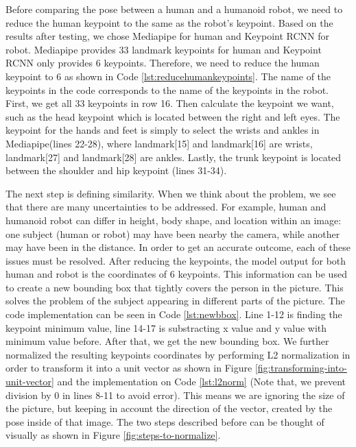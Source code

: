 Before comparing the pose between a human and a humanoid robot, we need to reduce the human keypoint to the same as the robot's keypoint.
Based on the results after testing, we chose Mediapipe for human and Keypoint RCNN for robot. Mediapipe provides 33 landmark keypoints for human and Keypoint RCNN only provides 6 keypoints.
Therefore, we need to reduce the human keypoint to 6 as shown in Code \ref{lst:reducehumankeypoints}.
The name of the keypoints in the code corresponds to the name of the keypoints in the robot. First, we get all 33 keypoints in row 16. Then calculate the keypoint we want, such as the head keypoint which is located between the right and left eyes.
The keypoint for the hands and feet is simply to select the wrists and ankles in Mediapipe(lines 22-28), where landmark[15] and landmark[16] are wrists, landmark[27] and landmark[28] are ankles. Lastly, the trunk keypoint is located between the shoulder and hip keypoint (lines 31-34).



The next step is defining similarity. When we think about the problem, we see that there are many uncertainties to be addressed. For example, human and humanoid robot can differ in height, body shape, and location within an image: one subject (human or robot) may have been nearby the camera,
while another may have been in the distance. In order to get an accurate outcome, each of these issues must be resolved.
After reducing the keypoints, the model output for both human and robot is the coordinates of 6 keypoints. This information can be used to create a new bounding box that tightly covers the person in the picture. This solves the problem of the subject appearing in different parts of the picture.
The code implementation can be seen in Code \ref{lst:newbbox}. Line 1-12 is finding the keypoint minimum value, line 14-17 is substracting x value and y value with minimum value before. After that, we get the new bounding box.
We further normalized the resulting keypoints coordinates by performing L2 normalization in order to transform it into a unit vector as shown in Figure \ref{fig:transforming-into-unit-vector} and the implementation on Code \ref{lst:l2norm} (Note that, we prevent division by 0 in lines 8-11 to avoid error).
This means we are ignoring the size of the picture, but keeping in account the direction of the vector, created by the pose inside of that image.
The two steps described before can be thought of visually as shown in Figure \ref{fig:steps-to-normalize}.

